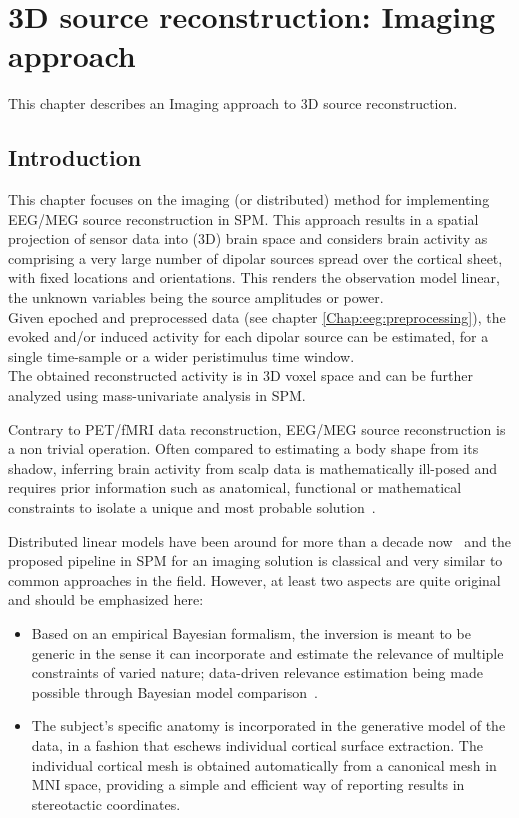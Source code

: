 \chapter{3D source reconstruction: Imaging approach \label{Chap:eeg:imaging}}

This chapter describes an Imaging approach to 3D source reconstruction.

\section{Introduction}
\label{sec:imaginv_intro}
This chapter focuses on the imaging (or distributed) method for implementing
EEG/MEG source reconstruction in SPM.
 This approach results in a spatial projection of sensor data into (3D) brain space and considers brain activity 
 as comprising a very large number of dipolar sources spread over the cortical sheet,
with fixed locations and orientations. This renders the observation model linear,
the unknown variables being the source amplitudes or power.\\
Given epoched and preprocessed data (see chapter \ref{Chap:eeg:preprocessing}), the evoked and/or induced
activity for each dipolar source can be estimated, for a single time-sample or a
wider peristimulus time window.\\
The obtained reconstructed activity is in 3D voxel space and can be further analyzed using mass-univariate analysis in SPM.

Contrary to PET/fMRI data reconstruction, EEG/MEG source reconstruction
is a non trivial operation. Often compared to estimating a body shape from
its shadow, inferring brain activity from scalp data is mathematically ill-posed
and requires prior information such as anatomical, functional or mathematical
constraints to isolate a unique and most probable solution~\cite{Baillet01}.

Distributed linear models have been around for more than a decade now~\cite{Dale93}
and the proposed pipeline in SPM for an imaging solution is classical and very similar
to common approaches in the field. However, at least two aspects are quite original
and should be emphasized here:

\begin{itemize}
\item Based on an empirical Bayesian formalism, the inversion is meant
to be generic in the sense it can incorporate and estimate the relevance
of multiple constraints of varied nature; data-driven relevance estimation
being made possible through Bayesian model
comparison~\cite{peb1,cp_empirical_eeg,jm_multiple,karl_induced}.
\item The subject's specific anatomy is incorporated in the generative model
of the data, in a fashion that eschews individual cortical surface extraction.
The individual cortical mesh is obtained automatically from a canonical mesh in
MNI space, providing a simple and efficient way of reporting results in stereotactic coordinates.
\end{itemize}

